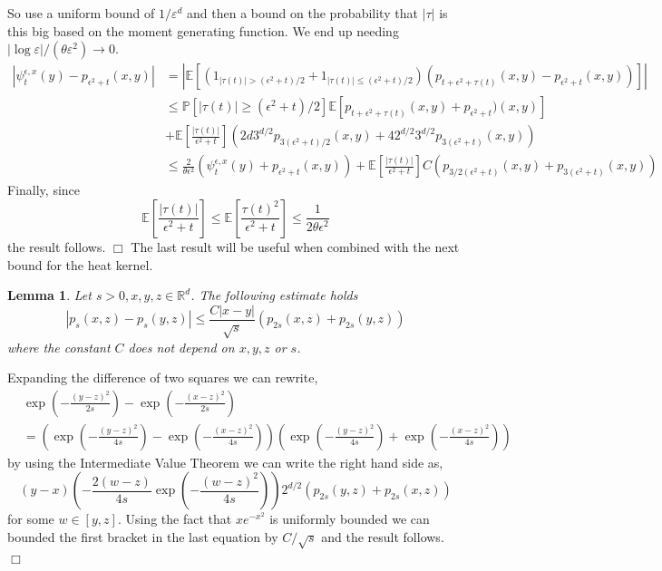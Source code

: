 \documentclass[12pt]{article}
\newenvironment {proof}{{\noindent\bf Proof }}{\hfill $\Box$ \medskip}
\newtheorem{lemma}[theorem]{Lemma}
\newcommand{\IP}{\mathbb P}
\newcommand{\IE}{\mathbb E}
\newcommand{\IR}{\mathbb R}
\begin{document}
\begin{proof}
{    So use a uniform bound of $1/\varepsilon^d$ and then a bound on the probability that $|\tau|$
    is this big based on the moment generating function.
    We end up needing $|\log \varepsilon| / (\theta \varepsilon^2) \to 0$.
    }
\begin{align*}
|\psi_t^{\epsilon,x}(y)-p_{\epsilon^2+t}(x,y)|
    &=
    | \mathbb{E}\left[ (1_{|\tau(t)| > (\epsilon^2+t)/2}+1_{|\tau(t)| \leq (\epsilon^2+t)/2})(p_{t+\epsilon^2+\tau(t)}(x,y)-p_{\epsilon^2+t}(x,y)) \right]| \\
    &\leq
    \IP[|\tau(t)| \geq (\epsilon^2+t)/2] \IE[p_{t+\epsilon^2+\tau(t)}(x,y) + p_{\epsilon^2+t})(x,y)] \\
    &+
    \mathbb{E}\left[ \frac{|\tau(t)|}{\epsilon^2+t}\right]\left( 2d3^{d/2} p_{3(\epsilon^2+t)/2} (x,y) + 4 2^{d/2}3^{d/2} p_{3(\epsilon^2+t)}(x,y)\right) \\
    & \leq
    \frac{2}{\theta \epsilon^2} (\psi_t^{\epsilon,x}(y)+p_{\epsilon^2+t}(x,y)) + \mathbb{E}\left[ \frac{|\tau(t)|}{\epsilon^2+t}\right] C (p_{3/2(\epsilon^2+t)}(x,y) + p_{3(\epsilon^2+t)}(x,y))
\end{align*}
Finally, since
\[ \mathbb{E}\left[ \frac{|\tau(t)|}{\epsilon^2+t}\right] \leq \mathbb{E}\left[ \frac{\tau(t)^2}{\epsilon^2+t}\right] \leq \frac{1}{2 \theta \epsilon^2} \]
the result follows.
\end{proof}
The last result will be useful when combined with the next bound for the heat kernel.
\begin{lemma}
Let $s>0, x, y, z\in \IR^d$. The following estimate holds
\[ |p_s(x,z) - p_s(y,z)| \leq \frac{C|x-y|}{\sqrt{s}} \left(p_{2s}(x,z) + p_{2s}(y,z)\right) \]
where the constant $C$ does not depend on $x,y,z$ or $s$.\label{Lemma:ContinuityHS}
\end{lemma}
\begin{proof}
Expanding the difference of two squares we can rewrite,
\begin{align*}
&\exp\left(-\frac{(y-z)^2}{2 s} \right)-\exp\left(-\frac{(x-z)^2}{2 s} \right) \\ &= \left(\exp\left(-\frac{(y-z)^2}{4 s} \right)-\exp\left(-\frac{(x-z)^2}{4 s} \right) \right)\left(\exp\left(-\frac{(y-z)^2}{4 s} \right)+\exp\left(-\frac{(x-z)^2}{4 s} \right) \right)
\end{align*}
by using the Intermediate Value Theorem we can write the right hand side as,
\[ (y-x) \left( - \frac{2(w-z)}{4s} \exp\left(-\frac{(w-z)^2}{4s}\right)\right) 2^{d/2}\left( p_{2s}(y,z)+p_{2s}(x,z) \right)\]
for some $w \in [y,z]$. Using the fact that $x e^{-x^2}$ is uniformly bounded we can bounded the first bracket in the last equation by $C/\sqrt{s}$ and the result follows.
\end{proof}
\end{document}
